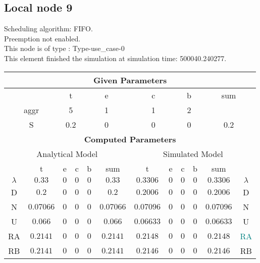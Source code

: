 \documentclass{article}
\begin{document}
\subsection{Local node 9}
Scheduling algorithm: FIFO.\\Preemption not enabled. \\This node is of type : Type-use\_case-0\\
This element finished the simulation at simulation time: 500040.240277.\\
\begin{table}[H]\centering\begin{tabular}{@{}c|cccc|c||cccc|c|c@{}}\toprule\multicolumn{12}{c}{\textbf{Given Parameters}}\\\midrule\multicolumn{2}{c|}{ } & \multicolumn{2}{c}{t} & \multicolumn{2}{c}{e} & \multicolumn{2}{c}{c} & \multicolumn{2}{c}{b} & \multicolumn{2}{|c}{sum} \\\midrule\multicolumn{2}{c|}{aggr} & \multicolumn{2}{c}{5} & \multicolumn{2}{c}{1} & \multicolumn{2}{c}{1} & \multicolumn{2}{c}{2} & \multicolumn{2}{|c}{ } \\ \midrule\multicolumn{2}{c|}{S} & \multicolumn{2}{c}{0.2} & \multicolumn{2}{c}{0} & \multicolumn{2}{c}{0} & \multicolumn{2}{c}{0} & \multicolumn{2}{|c}{0.2}\\ \midrule\midrule\multicolumn{12}{c}{\textbf{Computed Parameters}}\\ \midrule\multicolumn{6}{c||}{Analytical Model} & \multicolumn{6}{c}{Simulated Model}\\ 
 \midrule & t & e & c & b & sum & t & e & c & b & sum &  \\ \midrule$\lambda$ &$0.33$ & $0$ & $0$ & $0$ & $0.33$ & $0.3306$ & $0$ & $0$ & $0$ & $0.3306$& $\lambda$ \\D & $0.2$ & $0$ & $0$ & $0$ & $0.2$ & $0.2006$ & $0$ & $0$ & $0$ & $0.2006$& D\\N & $0.07066$ & $0$ & $0$ & $0$ & $0.07066$ & $0.07096$ & $0$ & $0$ & $0$ & $0.07096$& N\\U & $0.066$ & $0$ & $0$ & $0$ & $0.066$ & $0.06633$ & $0$ & $0$ & $0$ & $0.06633$& U\\RA & $0.2141$ & $0$ & $0$ & $0$ & $0.2141$ & $0.2148$ & $0$ & $0$ & $0$ & $0.2148$& \textcolor{teal}{RA}\\RB & $0.2141$ & $0$ & $0$ & $0$ & $0.2141$ & $0.2146$ & $0$ & $0$ & $0$ & $0.2146$& RB\\
\bottomrule
\end{tabular}
\end{table}
\filbreak
\end{document}
